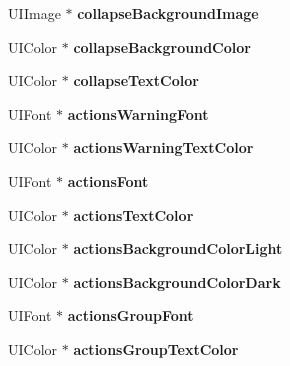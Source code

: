 \begin{DoxyCompactItemize}
\mbox{\label{interface_l_u_theme_a03b2154a55107e419fac89a3a6f99382}} 
U\+I\+Image $\ast$ {\bfseries collapse\+Background\+Image}
\item 
\mbox{\label{interface_l_u_theme_abb660a4abaa905a914d1b3dce6fcae0a}} 
U\+I\+Color $\ast$ {\bfseries collapse\+Background\+Color}
\item 
\mbox{\label{interface_l_u_theme_aefa16b7729e63807f506539d78607aba}} 
U\+I\+Color $\ast$ {\bfseries collapse\+Text\+Color}
\item 
\mbox{\label{interface_l_u_theme_aaf3144aaea79916bf8090f2f4fb97510}} 
U\+I\+Font $\ast$ {\bfseries actions\+Warning\+Font}
\item 
\mbox{\label{interface_l_u_theme_aaa41261871cd4038d0b80b3091acc3fc}} 
U\+I\+Color $\ast$ {\bfseries actions\+Warning\+Text\+Color}
\item 
\mbox{\label{interface_l_u_theme_a2c752aa90183b1d62ff4438e485dea9a}} 
U\+I\+Font $\ast$ {\bfseries actions\+Font}
\item 
\mbox{\label{interface_l_u_theme_ae7eb2fb447d0e3197c83c5dbfaf3e25f}} 
U\+I\+Color $\ast$ {\bfseries actions\+Text\+Color}
\item 
\mbox{\label{interface_l_u_theme_ab46185f2fdde209304cad9b4d17badb7}} 
U\+I\+Color $\ast$ {\bfseries actions\+Background\+Color\+Light}
\item 
\mbox{\label{interface_l_u_theme_aef62b74e281a20b1d36781fb0d59643c}} 
U\+I\+Color $\ast$ {\bfseries actions\+Background\+Color\+Dark}
\item 
\mbox{\label{interface_l_u_theme_ad3b84a1ab3a1cd8f069338e42d8a7315}} 
U\+I\+Font $\ast$ {\bfseries actions\+Group\+Font}
\item 
\mbox{\label{interface_l_u_theme_a0124253c556d261b8277472892ed0156}} 
U\+I\+Color $\ast$ {\bfseries actions\+Group\+Text\+Color}
\item 

\end{DoxyCompactItemize}
